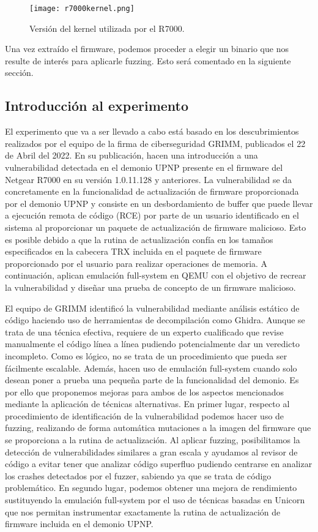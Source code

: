 \begin{figure}[H]
    \centering
    \texttt{[image: r7000kernel.png]}
    \caption{Versión del kernel utilizada por el R7000.}
    \label{fig:R7000kernel}
\end{figure}

Una vez extraído el firmware, podemos proceder a elegir un binario que nos resulte de interés para aplicarle fuzzing. Esto será
comentado en la siguiente sección.

\subsection{Introducción al experimento}
El experimento que va a ser llevado a cabo está basado en los descubrimientos realizados por el equipo de la firma de ciberseguridad GRIMM, publicados el
22 de Abril del 2022\cite{r7000GRIMM}. En su publicación, hacen una introducción a una vulnerabilidad detectada en el demonio UPNP presente en 
el firmware del Netgear R7000 en su versión 1.0.11.128 y anteriores. La vulnerabilidad se da concretamente en la funcionalidad de actualización de 
firmware proporcionada por el demonio UPNP y consiste en un desbordamiento de buffer que puede llevar a ejecución remota de código (RCE) por parte de un usuario 
identificado en el sistema al proporcionar un paquete de actualización de firmware malicioso. Esto es posible debido a que la rutina de actualización confía en los tamaños especificados en la cabecera TRX\cite{firmwareFormat} incluida en el paquete de firmware proporcionado 
por el usuario para realizar operaciones de memoria. A continuación, aplican emulación full-system en QEMU con el objetivo de recrear la vulnerabilidad 
y diseñar una prueba de concepto de un firmware malicioso.\bigskip

El equipo de GRIMM identificó la vulnerabilidad mediante análisis estático de código haciendo uso de herramientas de decompilación como Ghidra\cite{Ghidra}.
Aunque se trata de una técnica efectiva, requiere de un experto cualificado que revise manualmente el código línea a línea pudiendo potencialmente dar un veredicto incompleto. Como es lógico, no se trata de un procedimiento que pueda ser fácilmente escalable. Además, hacen uso de emulación full-system cuando solo desean
poner a prueba una pequeña parte de la funcionalidad del demonio. Es por ello que proponemos mejoras para ambos de los aspectos mencionados mediante la aplicación 
de técnicas alternativas. En primer lugar, respecto al procedimiento de identificación de la vulnerabilidad podemos hacer uso de fuzzing, realizando de forma 
automática mutaciones a la imagen del firmware que se proporciona a la rutina de actualización. Al aplicar fuzzing, posibilitamos la detección de vulnerabilidades 
similares a gran escala y ayudamos al revisor de código a evitar tener que analizar código superfluo pudiendo centrarse en analizar los crashes detectados por
el fuzzer, sabiendo ya que se trata de código problemático. En segundo lugar, podemos obtener una mejora de rendimiento sustituyendo la emulación full-system 
por el uso de técnicas basadas en Unicorn\cite{unicorn} que nos permitan instrumentar exactamente la rutina de actualización de firmware incluida en el 
demonio UPNP.\bigskip


